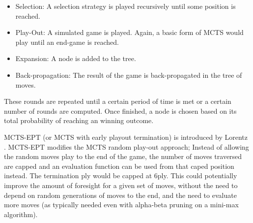 \documentclass[12pt,a4paper]{article}
\begin{document}
    \begin{itemize}
        \item Selection: A selection strategy is played recursively until some position is reached. 
        \item Play-Out: A simulated game is played. Again, a basic form of MCTS would play until an end-game is reached.
        \item Expansion: A node is added to the tree.
        \item Back-propagation: The result of the game is back-propagated in the tree of moves.
    \end{itemize}

    These rounds are repeated until a certain period of time is met or a certain number of rounds are computed. Once finished, a node is chosen based on its total probability of reaching an winning outcome.

    MCTS-EPT (or MCTS with early playout termination) is introduced by Lorentz \cite{lorentz_using_2016}. MCTS-EPT modifies the MCTS random play-out approach; Instead of allowing the random moves play to the end of the game, the number of moves traversed are capped and an evaluation function can be used from that caped position instead. The termination ply would be capped at 6ply. This could potentially improve the amount of foresight for a given set of moves, without the need to depend on random generations of moves to the end, and the need to evaluate more moves (as typically needed even with alpha-beta pruning on a mini-max algorithm).
\end{document}
